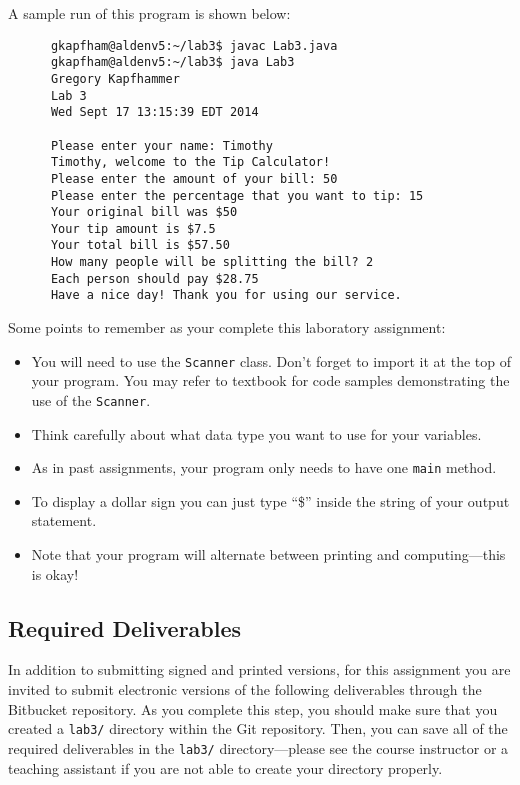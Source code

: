\noindent
A sample run of this program is shown below:

\begin{verbatim}
      gkapfham@aldenv5:~/lab3$ javac Lab3.java
      gkapfham@aldenv5:~/lab3$ java Lab3
      Gregory Kapfhammer
      Lab 3
      Wed Sept 17 13:15:39 EDT 2014

      Please enter your name: Timothy
      Timothy, welcome to the Tip Calculator!
      Please enter the amount of your bill: 50
      Please enter the percentage that you want to tip: 15
      Your original bill was $50
      Your tip amount is $7.5
      Your total bill is $57.50
      How many people will be splitting the bill? 2
      Each person should pay $28.75
      Have a nice day! Thank you for using our service.

\end{verbatim}
\vspace{-0.2in}
Some points to remember as your complete this laboratory assignment:
\begin{itemize}
\item You will need to use the {\tt Scanner} class. Don't forget to import it at the top of your program. You may refer to
  textbook for code samples demonstrating the use of the {\tt Scanner}.
\item Think carefully about what data type you want to use for your variables.
\item As in past assignments, your program only needs to have one {\tt main} method.
\item To display a dollar sign you can just type ``\$'' inside the string of your output statement.
\item Note that your program will alternate between printing and computing---this
is okay!
\end{itemize}

\vspace{-0.2in}
\subsection*{Required Deliverables}

In addition to submitting signed and printed versions, for this assignment you are invited to submit electronic versions
of the following deliverables through the Bitbucket repository. As you complete this step, you should make sure that you
created a {\tt lab3/} directory within the Git repository.  Then, you can save all of the required deliverables in the
{\tt lab3/} directory---please see the course instructor or a teaching assistant if you are not able to create your
directory properly.

